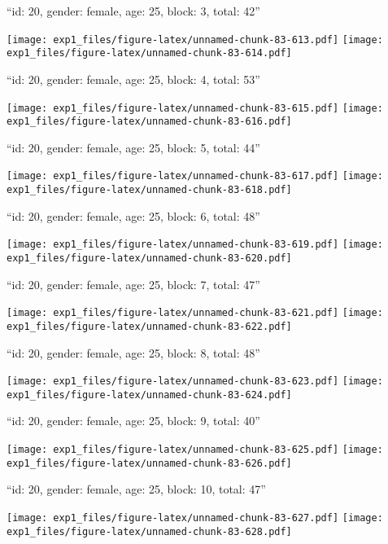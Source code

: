 \documentclass[11pt,,]{article}
\begin{document}
\newpage
[1] 

``id: 20, gender: female, age: 25, block: 3, total: 42''

\texttt{[image: exp1\_files/figure-latex/unnamed-chunk-83-613.pdf]}
\texttt{[image: exp1\_files/figure-latex/unnamed-chunk-83-614.pdf]}

\newpage
[1] 

``id: 20, gender: female, age: 25, block: 4, total: 53''

\texttt{[image: exp1\_files/figure-latex/unnamed-chunk-83-615.pdf]}
\texttt{[image: exp1\_files/figure-latex/unnamed-chunk-83-616.pdf]}

\newpage
[1] 

``id: 20, gender: female, age: 25, block: 5, total: 44''

\texttt{[image: exp1\_files/figure-latex/unnamed-chunk-83-617.pdf]}
\texttt{[image: exp1\_files/figure-latex/unnamed-chunk-83-618.pdf]}

\newpage
[1] 

``id: 20, gender: female, age: 25, block: 6, total: 48''

\texttt{[image: exp1\_files/figure-latex/unnamed-chunk-83-619.pdf]}
\texttt{[image: exp1\_files/figure-latex/unnamed-chunk-83-620.pdf]}

\newpage
[1] 

``id: 20, gender: female, age: 25, block: 7, total: 47''

\texttt{[image: exp1\_files/figure-latex/unnamed-chunk-83-621.pdf]}
\texttt{[image: exp1\_files/figure-latex/unnamed-chunk-83-622.pdf]}

\newpage
[1] 

``id: 20, gender: female, age: 25, block: 8, total: 48''

\texttt{[image: exp1\_files/figure-latex/unnamed-chunk-83-623.pdf]}
\texttt{[image: exp1\_files/figure-latex/unnamed-chunk-83-624.pdf]}

\newpage
[1] 

``id: 20, gender: female, age: 25, block: 9, total: 40''

\texttt{[image: exp1\_files/figure-latex/unnamed-chunk-83-625.pdf]}
\texttt{[image: exp1\_files/figure-latex/unnamed-chunk-83-626.pdf]}

\newpage
[1] 

``id: 20, gender: female, age: 25, block: 10, total: 47''

\texttt{[image: exp1\_files/figure-latex/unnamed-chunk-83-627.pdf]}
\texttt{[image: exp1\_files/figure-latex/unnamed-chunk-83-628.pdf]}
\end{document}
